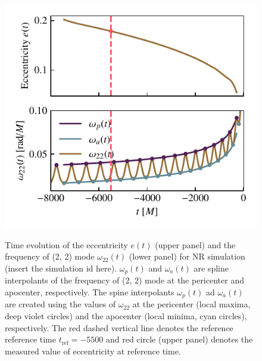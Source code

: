 \documentclass[aps,prd,amsmath,floats,floatfix, twocolumn,
superscriptaddress,nofootinbib,showpacs]{revtex4-1}
\begin{document}
\begin{figure}
  \centering
  \begin{minipage}[t]{0.475\textwidth}
    \centering
    \includegraphics[width=\columnwidth]{ecc_definition}
    \label{fig:ecc_definition}
    \caption{Time evolution of the eccentricity $e(t)$ (upper panel) and the frequency of (2, 2) mode $\omega_{22}(t)$ (lower panel) for NR simulation (insert the simulation id here).
      $\omega_p(t)$ and $\omega_a(t)$ are spline interpolants of the frequency of (2, 2) mode at the pericenter and apocenter, respectively. The spine interpolants $\omega_p(t)$ ad $\omega_a(t)$
      are created using the values of $\omega_{22}$ at the pericenter (local maxima, deep violet circles) and the apocenter (local minima, cyan circles), respectively. The red dashed vertical line
      denotes the reference reference time $t_{\text{ref}}=-5500$ and red circle (upper panel) denotes the measured value of eccentricity at reference time.}
    \end{minipage}\hfill
    \begin{minipage}[t]{0.475\textwidth}
      \centering

\end{minipage}
\end{figure}
\end{document}
